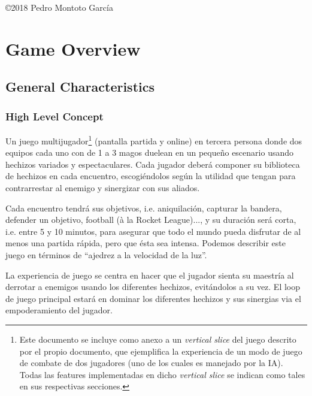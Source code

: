 \documentclass[12pt]{report}
\newcommand*\cleartoleftpage{%
  \clearpage
  \ifodd\value{page}\hbox{}\newpage\fi
}
\begin{document}
\vfill %

{\centering \hfill \copyright 2018 Pedro Montoto García} \\


\clearpage

\tableofcontents

\setlength{\voffset}{0cm}
\setlength{\parindent}{1cm}
\setcounter{page}{1}

\cleartoleftpage

\part{Game Overview}

\chapter{General Characteristics}

\section{High Level Concept}
\pagestyle{fancy}

Un juego multijugador\footnote{Este documento se incluye como anexo a un \textit{vertical slice} del juego descrito por el propio documento, que ejemplifica la experiencia de un modo de juego de combate de dos jugadores (uno de los cuales es manejado por la IA). Todas las features implementadas en dicho \textit{vertical slice} se indican como tales en sus respectivas secciones.} (pantalla partida y online) en tercera persona donde dos equipos cada uno con de 1 a 3 magos duelean en un pequeño escenario usando hechizos variados y espectaculares. Cada jugador deberá componer su biblioteca de hechizos en cada encuentro, escogiéndolos según la utilidad que tengan para contrarrestar al enemigo y sinergizar con sus aliados.

Cada encuentro tendrá sus objetivos, i.e. aniquilación, capturar la bandera, defender un objetivo, football (à la Rocket League)..., y su duración será corta, i.e. entre 5 y 10 minutos, para asegurar que todo el mundo pueda disfrutar de al menos una partida rápida, pero que ésta sea intensa. Podemos describir este juego en términos de ``ajedrez a la velocidad de la luz''.

La experiencia de juego se centra en hacer que el jugador sienta su maestría al derrotar a enemigos usando los diferentes hechizos, evitándolos a su vez. El loop de juego principal estará en dominar los diferentes hechizos y sus sinergias via el empoderamiento del jugador.
\end{document}

